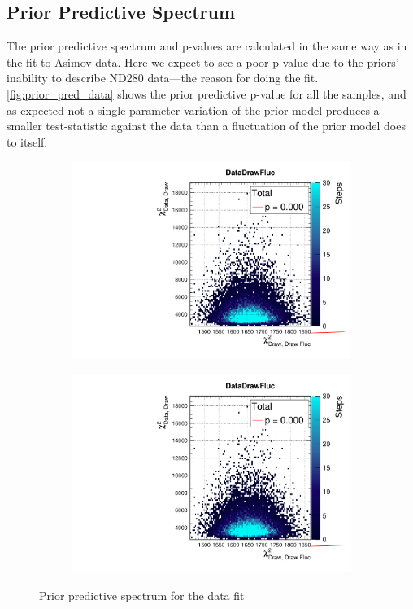 \subsection{Prior Predictive Spectrum}
\label{sec:prior_pred_data}
The prior predictive spectrum and p-values are calculated in the same way as in the fit to Asimov data. Here we expect to see a poor p-value due to the priors' inability to describe ND280 data---the reason for doing the fit. \autoref{fig:prior_pred_data} shows the prior predictive p-value for all the samples, and as expected not a single parameter variation of the prior model produces a smaller test-statistic against the data than a fluctuation of the prior model does to itself.
\begin{figure}[h]
	\begin{subfigure}[t]{0.49\textwidth}
		\includegraphics[width=\textwidth, trim={0mm 0mm 0mm 11mm}, clip,page=1]{figures/mach3/data/priorpred/2017b_NewDet_3Xsec_4Det_5Flux_NewXSecTune_Data_merge_PriorPred_procs}
	\end{subfigure}
	\begin{subfigure}[t]{0.49\textwidth}
		\includegraphics[width=\textwidth, trim={0mm 0mm 0mm 11mm}, clip,page=2]{figures/mach3/data/priorpred/2017b_NewDet_3Xsec_4Det_5Flux_NewXSecTune_Data_merge_PriorPred_procs}
	\end{subfigure}
	\caption{Prior predictive spectrum for the data fit}
	\label{fig:prior_pred_data}
\end{figure}

